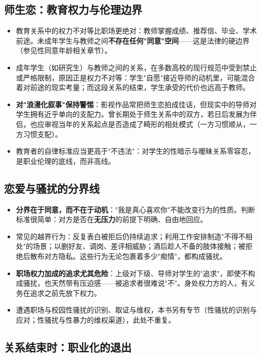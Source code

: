 \subsection{师生恋：教育权力与伦理边界}

\begin{itemize}
\item 教育关系中的权力不对等比职场更绝对：教师掌握成绩、推荐信、毕业、学术前途。未成年学生与教师之间\textbf{不存在任何"同意"空间}——这是法律的硬边界（参见性同意年龄相关章节）。
\item 成年学生（如研究生）与教师之间的关系，在多数高校的现行规范中受到禁止或严格限制，原因正是权力不对等：学生"自愿"接近导师的动机里，可能混合着对前途的现实考量；而这段关系的结束，学生承受的代价也远高于教师。
\item \textbf{对"浪漫化叙事"保持警惕}：影视作品常把师生恋拍成佳话，但现实中的导师对学生拥有近乎单向的支配力。曾长期处于师生关系中的双方，若日后发展为伴侣，也应审视当年的关系起点是否造成了畸形的相处模式（一方习惯顺从，一方习惯支配）。
\item 教育者的自律标准应当更高于"不违法"：对学生的性暗示与暧昧关系零容忍，是职业伦理的底线，而非高线。
\end{itemize}

\subsection{恋爱与骚扰的分界线}

\begin{itemize}
\item \textbf{分界在于同意，而不在于动机}："我是真心喜欢你"不能改变行为的性质。判断标准很简单：对方是否在\textbf{无压力}的前提下明确、自由地回应。
\item 常见的越界行为：反复表白被拒后仍持续追求；利用工作安排制造"不得不相处"的场景；以删好友、调岗、差评相威胁；酒后趁人不备的肢体接触；被拒绝后散布对方隐私。这些行为无论包裹着多少"痴情"，都构成骚扰。
\item \textbf{职场权力加成的追求尤其危险}：上级对下级、导师对学生的"追求"，即使不构成骚扰，也天然带有压迫感——被追求者很难说"不"。身处权力方的人，有义务在追求之前先放下权力。
\item 遭遇职场与校园性骚扰的识别、取证与维权，本书另有专节（性骚扰的识别与应对；性骚扰与性暴力的维权渠道），此处不重复。
\end{itemize}

\subsection{关系结束时：职业化的退出}

